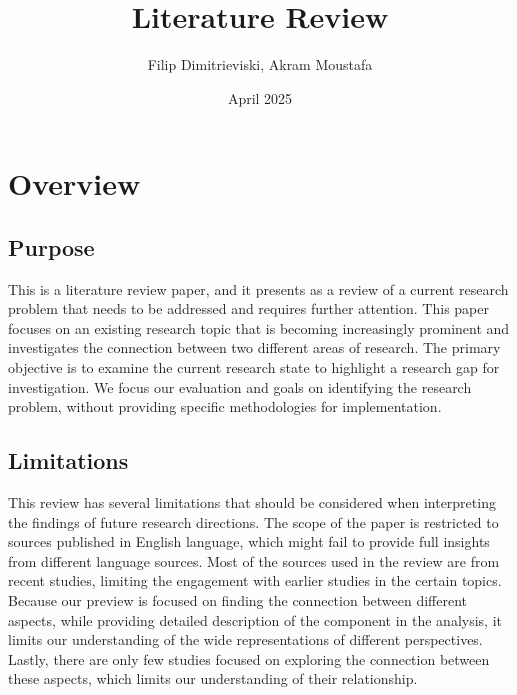 \documentclass[twocolumn]{article}
\title{Literature Review}
\author{Filip Dimitrieviski, Akram Moustafa}
\date{April 2025}
\begin{document}
\maketitle

\renewcommand{\thesection}{\Roman{section}}
\renewcommand{\thesubsection}{\Alph{subsection}}

\section{Overview}
\subsection{Purpose}
This is a literature review paper, and it presents as a review of a current research problem that needs to be addressed and requires further attention. This paper focuses on an existing research topic that is becoming increasingly prominent and investigates the connection between two different areas of research. The primary objective is to examine the current research state to highlight a research gap for investigation. We focus our evaluation and goals on identifying the research problem, without providing specific methodologies for implementation.
\subsection{Limitations}
This review has several limitations that should be considered when interpreting the findings of future research directions. The scope of the paper is restricted to sources published in English language, which might fail to provide full insights from different language sources. Most of the sources used in the review are from recent studies, limiting the engagement with earlier studies in the certain topics. Because our preview is focused on finding the connection between different aspects, while providing detailed description of the component in the analysis, it limits our understanding of the wide representations of different perspectives. Lastly, there are only few studies focused on exploring the connection between these aspects, which limits our understanding of their relationship. 
\end{document}
